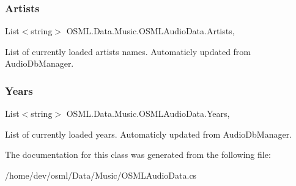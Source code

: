 \subsubsection{\texorpdfstring{Artists}{Artists}}
{\footnotesize\ttfamily List$<$string$>$ O\+S\+M\+L.\+Data.\+Music.\+O\+S\+M\+L\+Audio\+Data.\+Artists\hspace{0.3cm}{\ttfamily [static]}, {\ttfamily [get]}}



List of currently loaded artists names. Automaticly updated from Audio\+Db\+Manager. 

\mbox{\label{classOSML_1_1Data_1_1Music_1_1OSMLAudioData_a629e1cf6d911b7154716e85ce95ca88c}} 
\subsubsection{\texorpdfstring{Years}{Years}}
{\footnotesize\ttfamily List$<$string$>$ O\+S\+M\+L.\+Data.\+Music.\+O\+S\+M\+L\+Audio\+Data.\+Years\hspace{0.3cm}{\ttfamily [static]}, {\ttfamily [get]}}



List of currently loaded years. Automaticly updated from Audio\+Db\+Manager. 



The documentation for this class was generated from the following file\+:\begin{DoxyCompactItemize}
\item 
/home/dev/osml/\+Data/\+Music/O\+S\+M\+L\+Audio\+Data.\+cs\end{DoxyCompactItemize}
